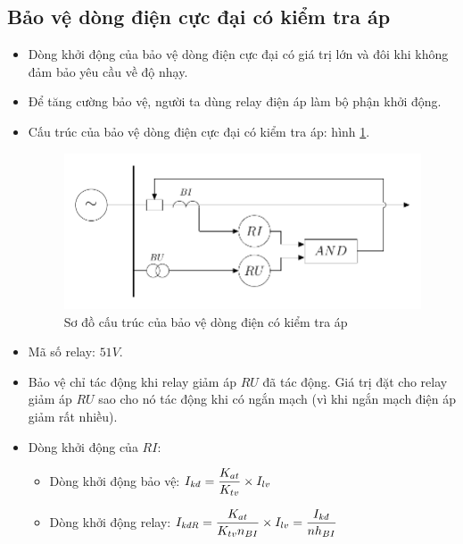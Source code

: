 \documentclass[12pt,a4paper]{article}
\begin{document}
\subsection{Bảo vệ dòng điện cực đại có kiểm tra áp}
	\begin{itemize}
		\item Dòng khởi động của bảo vệ dòng điện cực đại có giá trị lớn và đôi khi không đảm bảo yêu cầu về độ nhạy.
		
		\item Để tăng cường bảo vệ, người ta dùng relay điện áp làm bộ phận khởi động.
		
		\item Cấu trúc của bảo vệ dòng điện cực đại có kiểm tra áp: hình \ref{Fig:sodocautruc-bvdongdien-kiemtraap}.
			\begin{figure}[!h]
				\begin{center}					
					\includegraphics[scale=1]{diagram-draw-tikz/Figure-cautruc-baove-dongdiencokiemtraap.pdf} 
				\end{center}
				\caption{Sơ đồ cấu trúc của bảo vệ dòng điện có kiểm tra áp} \label{Fig:sodocautruc-bvdongdien-kiemtraap}
			\end{figure}

			\item Mã số relay: $51V$.
		
		\item Bảo vệ chỉ tác động khi relay giảm áp $RU$ đã tác động. Giá trị đặt cho relay giảm áp $RU$ sao cho nó tác động khi có ngắn mạch (vì khi ngắn mạch điện áp giảm rất nhiều).
		
		\item Dòng khởi động của $RI$:
			\begin{itemize}
				\item Dòng khởi động bảo vệ: $I_{\text{\textit{kđ}}} = \dfrac{K_{at}}{K_{tv}} \times I_{lv}$
				
				\item Dòng khởi động relay: $I_{\text{\textit{kđR}}} = \dfrac{K_{at}}{K_{tv}n_{BI}} \times I_{lv} = \dfrac{I_{\text{\textit{kđ}}}}{nh_{BI}}$
				

\end{itemize}
\end{itemize}
\end{document}
